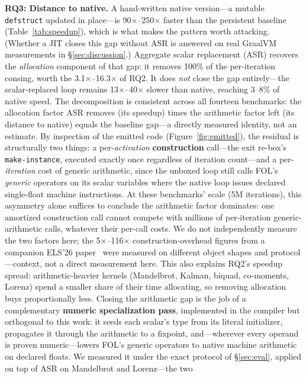 \documentclass[sigplan,screen,review,anonymous]{acmart}
\begin{document}
\textbf{RQ3: Distance to native.} A hand-written native version---a mutable
\texttt{defstruct} updated in place---is 90$\times$--250$\times$ faster than the
persistent baseline (Table~\ref{tab:speedup}), which is what makes the pattern
worth attacking. (Whether a JIT closes this
gap without ASR is answered on real GraalVM measurements in
\S\ref{sec:discussion}.) Aggregate scalar replacement (ASR) recovers
the \emph{allocation} component of that gap: it removes 100\% of the per-iteration
consing, worth the 3.1$\times$--16.3$\times$ of RQ2. It does \emph{not} close the
gap entirely---the scalar-replaced loop remains 13$\times$--40$\times$ slower
than native, reaching 3--8\% of native speed. The decomposition is consistent
across all fourteen benchmarks: the allocation factor ASR removes (its speedup)
times the arithmetic factor left (its distance to native) equals the
baseline gap---a directly measured identity, not an estimate. By inspection
of the emitted code (Figure~\ref{fig:emitted}), the residual is
structurally two things: a per-\emph{activation} \textbf{construction}
call---the exit re-box's \texttt{make-instance}, executed exactly once
regardless of iteration count---and a per-\emph{iteration} cost of generic
arithmetic, since the unboxed loop still calls FOL's \emph{generic}
operators on its scalar variables where the native loop issues declared
single-float machine instructions. At these benchmarks' scale (5M
iterations), this asymmetry alone suffices to conclude the arithmetic
factor dominates: one amortized construction call cannot compete with
millions of per-iteration generic-arithmetic calls, whatever their
per-call costs. We do not independently measure the
two factors here; the 5$\times$--116$\times$
construction-overhead figures from a companion ELS'26
paper~\cite{adrian2026fol-els} were measured on different object shapes
and protocol---context, not a direct measurement here. This
also explains RQ2's speedup spread: arithmetic-heavier kernels
(Mandelbrot, Kalman, biquad, co-moments, Lorenz) spend a smaller share of
their time allocating, so removing allocation buys proportionally less. Closing the arithmetic gap
is the job of a complementary \textbf{numeric specialization pass}, implemented
in the compiler but orthogonal to this work: it seeds each
scalar's type from its literal initializer, propagates it through the
arithmetic to a fixpoint, and---wherever every operand is proven
numeric---lowers FOL's generic operators to native machine arithmetic on
declared floats. We measured it under the exact protocol of
\S\ref{sec:eval}, applied on top of ASR on Mandelbrot and Lorenz---the two
\end{document}
